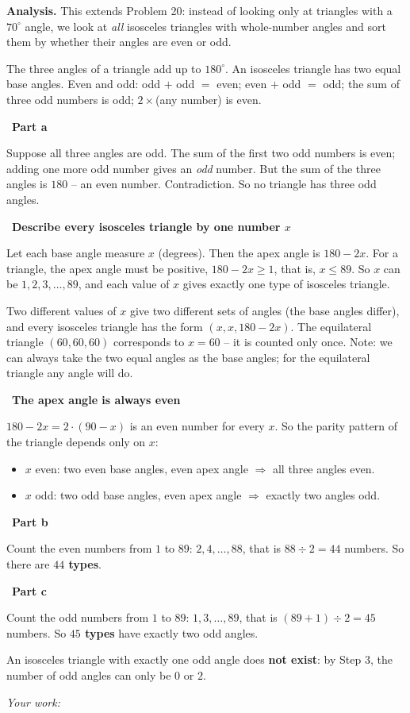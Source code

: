 \documentclass[11pt]{article}
\newif\ifsol \solfalse
\newcommand{\probsol}[1]{%
  \begin{lrbox}{\solmeasure}\begin{minipage}{\dimexpr\linewidth-24pt\relax}#1\end{minipage}\end{lrbox}%
  \ifsol
    \begin{solbox}#1\end{solbox}%
  \else
    \setlength{\solht}{\dimexpr\ht\solmeasure+\dp\solmeasure+0.85cm\relax}%
    \ifdim\solht<1.35cm\setlength{\solht}{1.35cm}\fi
    \ifdim\solht>\StudentMaxWork\setlength{\solht}{\StudentMaxWork}\fi
    \begin{tcolorbox}[colback=white,colframe=Line,boxrule=0.8pt,arc=5pt,
      left=8pt,right=8pt,top=4pt,bottom=4pt,height=\solht]{\footnotesize\color{Slate}\itshape\WorkWord}\end{tcolorbox}%
  \fi}
\newlength{\StudentMaxWork}\setlength{\StudentMaxWork}{7.5cm}
\newcommand{\step}[2]{\par\smallskip\noindent{\bfseries\color{tmBlue!85!black}\StepWord~#1.}\ {\bfseries #2}\par\nopagebreak}
\def\WorkWord{Your work:}
\def\StepWord{Step}
\begin{document}
\probsol{
\textbf{Analysis.} This extends Problem 20: instead of looking only at triangles with a $70^\circ$ angle, we look at \emph{all} isosceles triangles with whole-number angles and sort them by whether their angles are even or odd.
\begin{recallbox}The three angles of a triangle add up to $180^\circ$. An isosceles triangle has two equal base angles. Even and odd: odd $+$ odd $=$ even; even $+$ odd $=$ odd; the sum of three odd numbers is odd; $2\times$(any number) is even.\end{recallbox}

\step{1}{Part a}
Suppose all three angles are odd. The sum of the first two odd numbers is even; adding one more odd number gives an \emph{odd} number. But the sum of the three angles is $180$ -- an even number. Contradiction. So no triangle has three odd angles.

\step{2}{Describe every isosceles triangle by one number $x$}
Let each base angle measure $x$ (degrees). Then the apex angle is $180-2x$. For a triangle, the apex angle must be positive, $180-2x\ge 1$, that is, $x\le 89$. So $x$ can be $1,2,3,\dots,89$, and each value of $x$ gives exactly one type of isosceles triangle.
\begin{proofbox}Two different values of $x$ give two different sets of angles (the base angles differ), and every isosceles triangle has the form $(x,x,180-2x)$. The equilateral triangle $(60,60,60)$ corresponds to $x=60$ -- it is counted only once. Note: we can always take the two equal angles as the base angles; for the equilateral triangle any angle will do.\end{proofbox}

\step{3}{The apex angle is always even}
$180-2x=2\cdot(90-x)$ is an even number for every $x$. So the parity pattern of the triangle depends only on $x$:
\begin{itemize}[leftmargin=1.3em,itemsep=1pt]
\item $x$ even: two even base angles, even apex angle $\Rightarrow$ all three angles even.
\item $x$ odd: two odd base angles, even apex angle $\Rightarrow$ exactly two angles odd.
\end{itemize}

\step{4}{Part b}
Count the even numbers from $1$ to $89$: $2,4,\dots,88$, that is $88\div 2=44$ numbers. So there are \textbf{$44$ types}.

\step{5}{Part c}
Count the odd numbers from $1$ to $89$: $1,3,\dots,89$, that is $(89+1)\div 2=45$ numbers. So \textbf{$45$ types} have exactly two odd angles.\par
An isosceles triangle with exactly one odd angle does \textbf{not exist}: by Step 3, the number of odd angles can only be $0$ or $2$.

}
\end{document}
